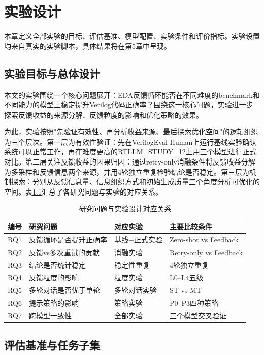 \chapter{实验设计}

本章定义全部实验的目标、评估基准、模型配置、实验条件和评价指标。实验设置均来自真实的实验脚本，具体结果将在第5章中呈现。

\section{实验目标与总体设计}

本文的实验围绕一个核心问题展开：EDA反馈循环能否在不同难度的benchmark和不同能力的模型上稳定提升Verilog代码正确率？围绕这一核心问题，实验进一步探索反馈收益的来源分解、反馈粒度的影响和优化策略的效果。

为此，实验按照"先验证有效性、再分析收益来源、最后探索优化空间"的逻辑组织为三个层次。第一层为有效性验证：先在VerilogEval-Human上运行基线实验确认系统可以正常工作，再在难度更高的RTLLM\_STUDY\_12上用三个模型进行正式对比。第二层关注反馈收益的因果归因：通过retry-only消融条件将反馈收益分解为多采样和反馈信息两个来源，并用4轮独立重复检验结论是否稳定。第三层为机制探索：分别从反馈信息量、信息组织方式和初始生成质量三个角度分析可优化的空间。表\ref{tab:rq_experiment}汇总了各研究问题与实验的对应关系。

\begin{table}[htbp]
\centering
\caption{研究问题与实验设计对应关系}
\label{tab:rq_experiment}
\begin{tabular}{clll}
\toprule
编号 & 研究问题 & 对应实验 & 主要比较条件 \\
\midrule
RQ1 & 反馈循环是否提升正确率 & 基线+正式实验 & Zero-shot vs Feedback \\
RQ2 & 反馈vs多次重试的贡献 & 消融实验 & Retry-only vs Feedback \\
RQ3 & 结论是否统计稳定 & 稳定性重复 & 4轮独立重复 \\
RQ4 & 反馈粒度的影响 & 粒度实验 & L0--L4五级 \\
RQ5 & 多轮对话是否优于单轮 & 多轮对话实验 & ST vs MT \\
RQ6 & 提示策略的影响 & 策略实验 & P0--P3四种策略 \\
RQ7 & 跨模型一致性 & 全部实验 & 三个模型交叉验证 \\
\bottomrule
\end{tabular}
\end{table}

\section{评估基准与任务子集}

